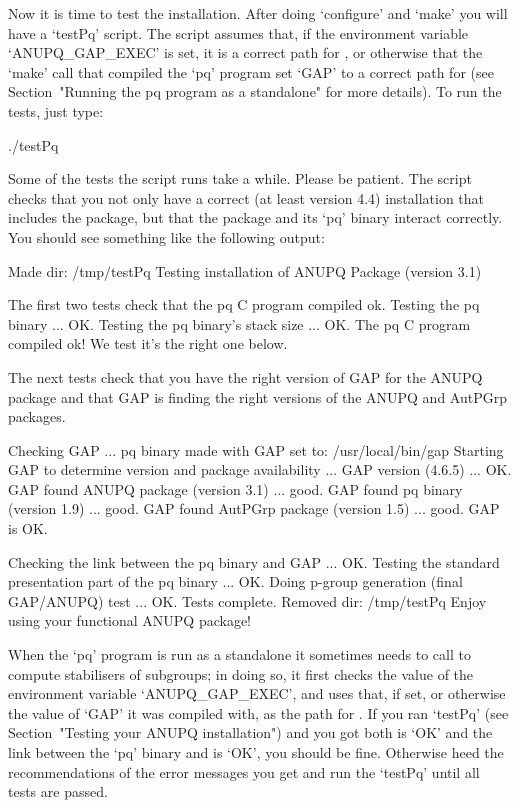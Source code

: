 
Now it is time to test the  installation.  After  doing  `configure'  and
`make' you will have a `testPq' script. The script assumes that,  if  the
environment variable `ANUPQ_GAP_EXEC' is set, it is a  correct  path  for
{\GAP}, or otherwise that the `make' call that compiled the  `pq' program
set `GAP' to a correct path  for  {\GAP}  (see  Section~"Running  the  pq
program as a standalone" for more details). To run the tests, just type:

\begintt
./testPq
\endtt

Some of the tests the script runs take a while. Please  be  patient.  The
script checks that you not only have a correct {\GAP} (at  least  version
4.4) installation that includes the  {\AutPGrp}  package,  but  that  the
{\ANUPQ} package and its `pq' binary interact correctly. You  should  see
something like the following output:

\begintt
Made dir: /tmp/testPq
Testing installation of ANUPQ Package (version 3.1)
 
The first two tests check that the pq C program compiled ok.
Testing the pq binary ... OK.
Testing the pq binary's stack size ... OK.
The pq C program compiled ok! We test it's the right one below.
 
The next tests check that you have the right version of GAP
for the ANUPQ package and that GAP is finding
the right versions of the ANUPQ and AutPGrp packages.
 
Checking GAP ...
 pq binary made with GAP set to: /usr/local/bin/gap
 Starting GAP to determine version and package availability ...
  GAP version (4.6.5) ... OK.
  GAP found ANUPQ package (version 3.1) ... good.
  GAP found pq binary (version 1.9) ... good.
  GAP found AutPGrp package (version 1.5) ... good.
 GAP is OK.
 
Checking the link between the pq binary and GAP ... OK.
Testing the standard presentation part of the pq binary ... OK.
Doing p-group generation (final GAP/ANUPQ) test ... OK.
Tests complete.
Removed dir: /tmp/testPq
Enjoy using your functional ANUPQ package!
\endtt


When the `pq' program is run as a standalone it sometimes  needs  to call
{\GAP} to compute stabilisers of subgroups; in doing so, it first  checks
the value of the environment variable `ANUPQ_GAP_EXEC', and uses that, if
set, or otherwise the value of `GAP' it was compiled with,  as  the  path
for  {\GAP}.  If  you  ran  `testPq'  (see  Section~"Testing  your  ANUPQ
installation") and you got both {\GAP} is `OK' and the link  between  the
`pq' binary and {\GAP} is `OK', you should be fine.  Otherwise  heed  the
recommendations of the error messages you get and run the `testPq'  until
all tests are passed.

